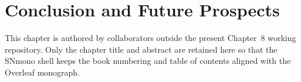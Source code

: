 \chapter{Conclusion and Future Prospects}
\label{ch:conclusion}




This chapter is authored by collaborators outside the present Chapter~8 working repository. Only the chapter title and abstract are retained here so that the SNmono shell keeps the book numbering and table of contents aligned with the Overleaf monograph.
